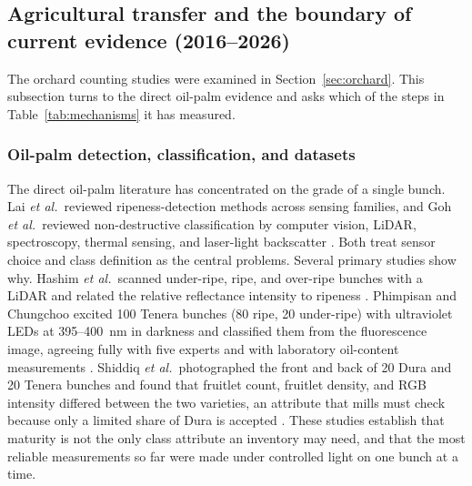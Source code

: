 \subsection{Agricultural transfer and the boundary of current evidence (2016--2026)}

The orchard counting studies were examined in Section~\ref{sec:orchard}. This subsection turns to the direct oil-palm evidence and asks which of the steps in Table~\ref{tab:mechanisms} it has measured.

\subsubsection{Oil-palm detection, classification, and datasets}

The direct oil-palm literature has concentrated on the grade of a single bunch. Lai \textit{et al.}\ reviewed ripeness-detection methods across sensing families, and Goh \textit{et al.}\ reviewed non-destructive classification by computer vision, LiDAR, spectroscopy, thermal sensing, and laser-light backscatter \cite{lai2023palmslr,goh2025palmreview}. Both treat sensor choice and class definition as the central problems. Several primary studies show why. Hashim \textit{et al.}\ scanned under-ripe, ripe, and over-ripe bunches with a LiDAR and related the relative reflectance intensity to ripeness \cite{ledger_r_97003608b250cdc5}. Phimpisan and Chungchoo excited 100 Tenera bunches (80 ripe, 20 under-ripe) with ultraviolet LEDs at 395--400~nm in darkness and classified them from the fluorescence image, agreeing fully with five experts and with laboratory oil-content measurements \cite{ledger_r_1c81e223679e4bfe}. Shiddiq \textit{et al.}\ photographed the front and back of 20 Dura and 20 Tenera bunches and found that fruitlet count, fruitlet density, and RGB intensity differed between the two varieties, an attribute that mills must check because only a limited share of Dura is accepted \cite{ledger_r_722bfce242f37ecb}. These studies establish that maturity is not the only class attribute an inventory may need, and that the most reliable measurements so far were made under controlled light on one bunch at a time.

